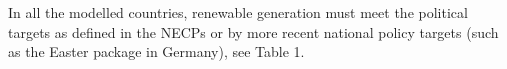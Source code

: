 In all the modelled countries, renewable generation must meet the political targets as defined in the NECPs or by more recent national policy targets (such as the Easter package in Germany), see Table 1.

